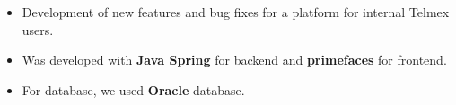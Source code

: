 \documentclass[letterpaper]{style} %
\begin{document}

\newpage %

\makeprofileSecond %

\begin{itemize}
	\item Development of new features and bug fixes for a platform for internal Telmex users.
	\item Was developed with \textbf{Java Spring} for backend and \textbf{primefaces} for frontend.
	\item For database, we used \textbf{Oracle} database.
\end{itemize}





\divider
\end{document}
